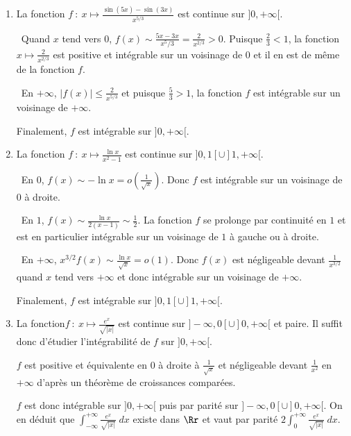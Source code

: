{{\begin{enumerate}
\textbullet~Quand $x$ tend vers $+\infty$, $x^2f(x)=\text{exp}\left(-\ln^2x+2\ln x\right)\rightarrow0$. Donc $f$ est négligeable devant  $\frac{1}{x^2}$ quand $x$ tend vers $+\infty$ et $f$ est intégrable sur un voisinage de $+\infty$.

Finalement, $f$ est intégrable sur $]0,+\infty[$.

\item  La fonction $f~:~x\mapsto\frac{\sin(5x)-\sin(3x)}{x^{5/3}}$  est continue sur $]0,+\infty[$.

\textbullet~Quand $x$ tend vers $0$,  $f(x)\sim\frac{5x-3x}{x^5/3}=\frac{2}{x^{2/3}}>0$. Puisque $\frac{2}{3}<1$, la fonction $x\mapsto\frac{2}{x^{2/3}}$ est positive et intégrable sur un voisinage de $0$ et il en est de même de la fonction $f$.

\textbullet~En $+\infty$, $|f(x)|\leqslant\frac{2}{x^{5/3}}$ et puisque $\frac{5}{3}>1$, la fonction $f$ est intégrable sur  un voisinage de $+\infty$.

Finalement, $f$ est intégrable sur $]0,+\infty[$.

\item  La fonction $f~:~x\mapsto\frac{\ln x}{x^2-1}$ est continue sur $]0,1[\cup]1,+\infty[$.

\textbullet~En $0$,  $f(x)\sim-\ln x=o\left(\frac{1}{\sqrt{x}}\right)$. Donc $f$ est intégrable sur un voisinage de $0$ à droite.

\textbullet~En $1$, $f(x)\sim\frac{\ln x}{2(x-1)}\sim\frac{1}{2}$. La fonction $f$ se prolonge par continuité en $1$ et est en particulier intégrable sur un voisinage de $1$ à gauche ou à droite.

\textbullet~En $+\infty$,  $x^{3/2}f(x)\sim\frac{\ln x}{\sqrt{x}}=o(1)$. Donc $f(x)$ est négligeable devant $\frac{1}{x^{3/2}}$ quand $x$ tend vers $+\infty$ et donc intégrable sur un voisinage de $+\infty$.

Finalement, $f$ est intégrable sur $]0,1[\cup]1,+\infty[$.

\item  La fonction$f~:~x\mapsto\frac{e^x}{\sqrt{|x|}}$ est continue sur $]-\infty,0[\cup]0,+\infty[$ et paire. Il suffit donc d'étudier l'intégrabilité de $f$ sur $]0,+\infty[$.

$f$ est positive et équivalente en $0$ à droite à $\frac{1}{\sqrt{x}}$ et négligeable devant $\frac{1}{x^2}$  en $+\infty$ d'après un théorème de croissances comparées.

$f$ est donc intégrable sur $]0,+\infty[$ puis par parité sur $]-\infty,0[\cup]0,+\infty[$. On en déduit que $\int_{-\infty}^{+\infty}\frac{e^x}{\sqrt{|x|}}\;dx$ existe dans $\Rr$ et vaut par parité $2\int_{0}^{+\infty}\frac{e^x}{\sqrt{|x|}}\;dx$.


\end{enumerate}}}
